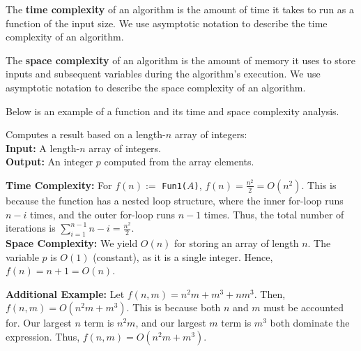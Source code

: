 \begin{Def}
    
        The \textbf{time complexity} of an algorithm is the amount of time it takes to run as a function of the input size. We use asymptotic notation to describe the time complexity of an algorithm.
\end{Def}

\begin{Def}
    
        The \textbf{space complexity} of an algorithm is the amount of memory it uses to store inputs and subsequent variables during the algorithm's execution. We use asymptotic notation to describe the space complexity of an algorithm.
\end{Def}
\noindent
Below is an example of a function and its time and space complexity analysis.

\begin{Func}
    Computes a result based on a length-$n$ array of integers:\\

    \noindent
    \textbf{Input: } A length-$n$ array of integers.\\
    \textbf{Output: } An integer $p$ computed from the array elements.\\
    \begin{algorithm}[H]
        \SetAlgoLined
        
        \vspace{.5em}
    \end{algorithm}

    \noindent
    \textbf{Time Complexity:} For $f(n):=$ \texttt{Fun1($A$)}, $f(n)=\frac{n^2}{2}=O(n^2)$. This is because the function has a nested loop structure, where the inner for-loop runs $n-i$ times, and the outer for-loop runs $n-1$ times. Thus, the total number of iterations is $\sum_{i=1}^{n-1}n-i=\frac{n^2}{2}$.\\

    \noindent
    \textbf{Space Complexity:} We yield $O(n)$ for storing an array of length $n$. The variable $p$ is $O(1)$ (constant), as it is a single integer. Hence, $f(n)=n+1=O(n)$.
    \end{Func}   

    \noindent
    \textbf{Additional Example:} Let $f(n,m) = n^2m + m^3 + nm^3$. Then, $f(n,m)=O(n^2m+m^3)$. This is because both $n$ and $m$ must be accounted for. Our largest $n$ term is $n^2m$, and our largest $m$ term is $m^3$ both dominate the expression. Thus, $f(n,m)=O(n^2m+m^3)$.



